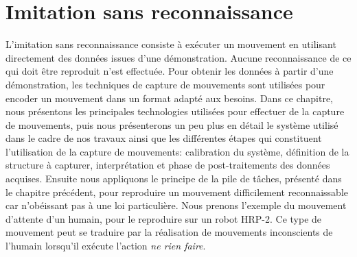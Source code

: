 \chapter{Imitation sans reconnaissance}
\label{chap:imitation}

L'imitation sans reconnaissance consiste à exécuter un mouvement
en utilisant directement des données issues d'une démonstration. Aucune
reconnaissance de ce qui doit être reproduit n'est effectuée.
Pour obtenir les données à partir d'une démonstration, les
techniques de capture de mouvements sont utilisées pour encoder 
un mouvement dans un format adapté aux besoins.
Dans ce chapitre, nous présentons les 
principales technologies utilisées pour effectuer de la capture
de mouvements, puis nous présenterons un peu plus en détail le système utilisé
dans le cadre de nos travaux ainsi que les différentes étapes qui constituent
l'utilisation de la capture de mouvements:
calibration du système, définition de la structure à capturer, interprétation
et phase de post-traitements des données acquises.
Ensuite nous appliquons le principe de la pile de t\^aches, présenté
dans le chapitre précédent, pour reproduire un mouvement difficilement 
reconnaissable car n'obéissant pas à une loi particulière.
Nous prenons l'exemple du mouvement d'attente d'un humain, pour le reproduire sur
un robot HRP-2.
Ce type de mouvement peut se traduire par la réalisation de mouvements inconscients de l'humain
lorsqu'il exécute l'action \emph{ne rien faire}.

